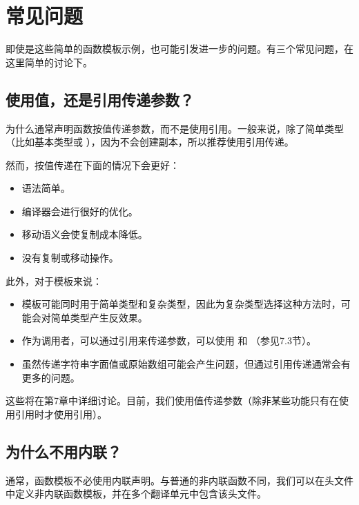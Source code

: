 \section{常见问题}

即使是这些简单的函数模板示例，也可能引发进一步的问题。有三个常见问题，在这里简单的讨论下。

\subsection{使用值，还是引用传递参数？}

为什么通常声明函数按值传递参数，而不是使用引用。一般来说，除了简单类型（比如基本类型或 ），因为不会创建副本，所以推荐使用引用传递。

然而，按值传递在下面的情况下会更好：

\begin{itemize}
\item
语法简单。

\item 
编译器会进行很好的优化。

\item
移动语义会使复制成本降低。

\item 
没有复制或移动操作。
\end{itemize}

此外，对于模板来说：

\begin{itemize}
\item
模板可能同时用于简单类型和复杂类型，因此为复杂类型选择这种方法时，可能会对简单类型产生反效果。

\item 
作为调用者，可以通过引用来传递参数，可以使用  和 （参见7.3节）。

\item
虽然传递字符串字面值或原始数组可能会产生问题，但通过引用传递通常会有更多的问题。
\end{itemize}

这些将在第7章中详细讨论。目前，我们使用值传递参数（除非某些功能只有在使用引用时才使用引用）。

\subsection{为什么不用内联？}
 
通常，函数模板不必使用内联声明。与普通的非内联函数不同，我们可以在头文件中定义非内联函数模板，并在多个翻译单元中包含该头文件。

